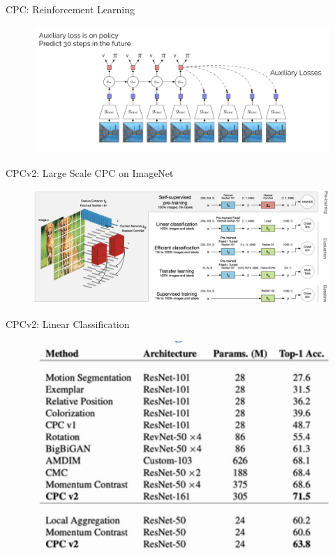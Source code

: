 \begin{frame}[allowframebreaks]{CPC: Reinforcement Learning}
    \begin{figure}
        \centering
        \includegraphics[width=1\linewidth,height=0.9\textheight,keepaspectratio]{images/ssl/slide_58_1_img.png}
    \end{figure}
\end{frame}


\begin{frame}[allowframebreaks]{CPCv2: Large Scale CPC on ImageNet}
    \begin{figure}
        \centering
        \includegraphics[width=1\linewidth,height=0.9\textheight,keepaspectratio]{images/ssl/slide_59_1_img.png}
    \end{figure}
\end{frame}

\begin{frame}[allowframebreaks]{CPCv2: Linear Classification}
    \begin{figure}
        \centering
        \includegraphics[width=1\linewidth,height=0.9\textheight,keepaspectratio]{images/ssl/slide_60_1_img.png}
    \end{figure}
\end{frame}


